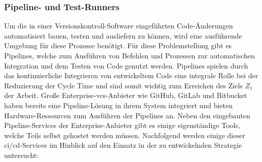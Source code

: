 \subsubsection{Pipeline- und Test-Runners}

Um die in einer Versionskontroll-Software eingeführten Code-Änderungen automatisiert bauen, testen und ausliefern zu
können, wird eine ausführende Umgebung für diese Prozesse benötigt.
Für diese Problemstellung gibt es Pipelines, welche zum Ausführen von Befehlen und Prozessen zur automatischen
Integration und dem Testen von Code genutzt werden.
Pipelines spielen durch das kontinuierliche Integrieren von entwickeltem Code eine integrale Rolle bei der Reduzierung
der Cycle Time und sind somit wichtig zum Erreichen des Ziels $Z_1$ der Arbeit.
Große Enterprise-\acrshort{vcs}-Anbieter wie GitHub, GitLab und Bitbucket haben bereits eine Pipeline-Lösung in ihrem
System integriert und bieten Hardware-Ressourcen zum Ausführen der Pipelines an.
Neben den eingebauten Pipeline-Services der Enterprise-Anbieter gibt es einige eigenständige Tools, welche Teils selbst
gehostet werden müssen.
Nachfolgend werden einige dieser \acrshort{ci}/\acrshort{cd}-Services im Hinblick auf den Einsatz in der zu
entwickelnden Strategie untersucht:

